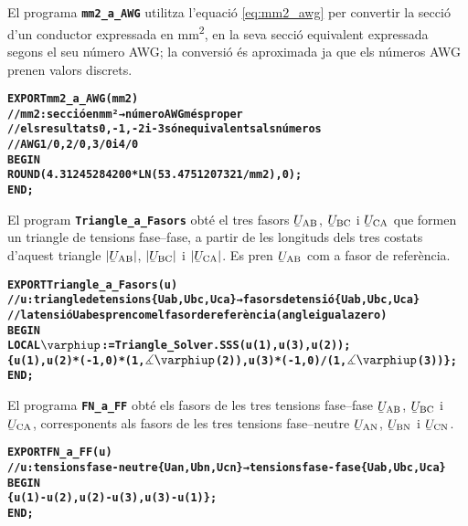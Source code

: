 El programa \texttt{\textbf{mm2\_a\_AWG}} utilitza l'equació \eqref{eq:mm2_awg} per convertir la secció d'un conductor expressada en \si{mm^2}, en la seva secció equivalent expressada segons el seu número AWG; la conversió és aproximada ja que els números AWG prenen valors discrets.
\vspace{-6mm}
\begin{alltt}
\bfseries
{}
    EXPORT mm2_a_AWG(mm2)
    // mm2:secció en mm² → número AWG més proper
    // els resultats 0, -1, -2 i -3 són equivalents als números
    // AWG 1/0, 2/0, 3/0 i 4/0
    BEGIN
      ROUND(4.31245284200*LN(53.4751207321/mm2),0);
    END;
\end{alltt}


El program \texttt{\textbf{Triangle\_a\_Fasors}} obté el tres fasors $\cmplx{U}\ped{AB}$, $\cmplx{U}\ped{BC}$ i $\cmplx{U}\ped{CA}$ que formen un triangle de tensions fase--fase, a partir de les longituds dels tres costats d'aquest triangle $|\cmplx{U}\ped{AB}|$, $|\cmplx{U}\ped{BC}|$ i $|\cmplx{U}\ped{CA}|$. Es pren $\cmplx{U}\ped{AB}$ com a fasor de referència.
\vspace{-6mm}
\begin{alltt}
\bfseries
{}
    EXPORT Triangle_a_Fasors(u)
    // u:triangle de tensions \{Uab,Ubc,Uca\} → fasors de tensió \{Uab,Ubc,Uca\}
    // la tensió Uab es pren com el fasor de referència (angle igual a zero)
    BEGIN
      LOCAL \(\varphiup\):=Triangle_Solver.SSS(u(1),u(3),u(2));
      \{u(1),u(2)*(-1,0)*(1,\(\measuredangle\varphiup\)(2)),u(3)*(-1,0)/(1,\(\measuredangle\varphiup\)(3))\};
    END;
\end{alltt}

El programa \texttt{\textbf{FN\_a\_FF}} obté els fasors de les tres tensions fase--fase $\cmplx{U}\ped{AB}$, $\cmplx{U}\ped{BC}$ i $\cmplx{U}\ped{CA}$, corresponents als fasors de les tres tensions fase--neutre
$\cmplx{U}\ped{AN}$, $\cmplx{U}\ped{BN}$ i $\cmplx{U}\ped{CN}$.
\vspace{-6mm}
\begin{alltt}
\bfseries
{}
    EXPORT FN_a_FF(u)
    // u:tensions fase-neutre \{Uan,Ubn,Ucn\} → tensions fase-fase \{Uab,Ubc,Uca\}
    BEGIN
      \{u(1)-u(2),u(2)-u(3),u(3)-u(1)\};
    END;
\end{alltt}

